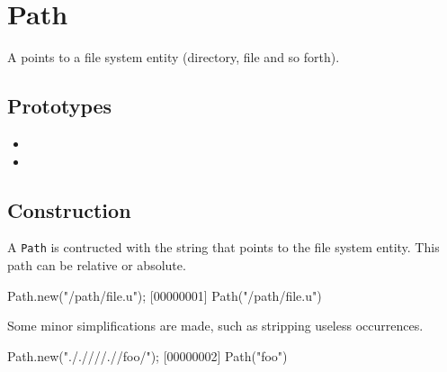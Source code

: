\section{Path}

A  points to a file system entity (directory, file and so
forth).

\subsection{Prototypes}
\begin{itemize}
\item {}
\item {}
\end{itemize}

\subsection{Construction}

A \lstinline|Path| is contructed with the string that points to the
file system entity. This path can be relative or absolute.

\begin{urbiscript}[firstnumber=1]
Path.new("/path/file.u");
[00000001] Path("/path/file.u")
\end{urbiscript}

Some minor simplifications are made, such as stripping useless
 occurrences.

\begin{urbiscript}[firstnumber=last]
Path.new("././///.//foo/");
[00000002] Path("foo")
\end{urbiscript}

